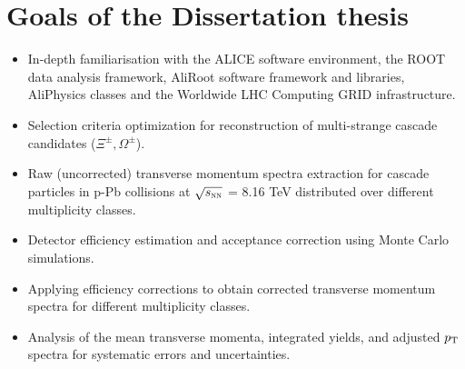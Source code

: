 \chapter{Goals of the Dissertation thesis}
\begin{itemize}
      \item In-depth familiarisation with the ALICE software environment, the ROOT data analysis framework, AliRoot software framework and libraries,
            AliPhysics classes and the Worldwide LHC Computing GRID infrastructure.
      \item Selection criteria optimization for reconstruction of multi-strange cascade candidates ($\Xi^{\pm}, \Omega^{\pm}$).
      \item Raw (uncorrected) transverse momentum spectra extraction for cascade particles in p-Pb collisions at $\sqrt{s_{\textnormal{\sc nn}}}$ =
            8.16 
            TeV distributed over different multiplicity classes.
      \item Detector efficiency estimation and acceptance correction using Monte Carlo simulations.
      \item Applying efficiency corrections to obtain corrected transverse momentum spectra for different multiplicity classes.
      \item Analysis of the mean transverse momenta, integrated yields, and adjusted $p_{\textnormal{T}}$ spectra for systematic errors and uncertainties.
\end{itemize}